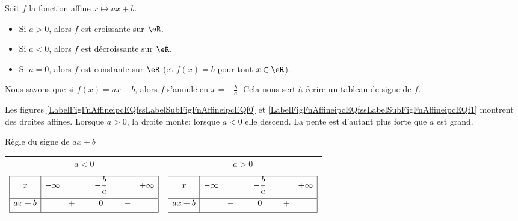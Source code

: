 \begin{Aretenir}
      Soit $f$ la fonction affine $x\mapsto ax+b$.
      \begin{itemize}
      \item Si $a>0$, alors $f$ est croissante sur $\eR$.
      \item Si $a<0$, alors $f$ est décroissante sur $\eR$.
      \item Si $a=0$, alors $f$ est constante sur $\eR$
        (et $f(x)=b$ pour tout $x\in\eR$).
      \end{itemize}
\end{Aretenir}
Nous savons que si \( f(x)=ax+b\), alors \( f\) s'annule en \( x=-\frac{ b }{ a }\). Cela nous sert à écrire un tableau de signe de \( f\).



Les figures \ref{LabelFigFnAffineipcEQfssLabelSubFigFnAffineipcEQf0} et \ref{LabelFigFnAffineipcEQfssLabelSubFigFnAffineipcEQf1} montrent des droites affines. Lorsque \( a>0\), la droite monte; lorsque \( a<0\) elle descend. La pente est d'autant plus forte que \( a\) est grand.
\newcommand{\CaptionFigFnAffineipcEQf}{Deux droites affines.}





\begin{Aretenir}
      Règle du signe de $ax+b$ \\
      
      \begin{tabular}{cc}
        $a<0$ & $a>0$ \\
        & \\
        $\begin{array}{|c|ccccc|}
          \hline
          x & -\infty & & -\dfrac{b}{a} & & +\infty \\[2ex]
          \hline
          ax+b & & + \quad \ & 0 & \quad - & \\[1ex]
          \hline
        \end{array}$
        &
        $\begin{array}{|c|ccccc|}
          \hline
          x & -\infty & & -\dfrac{b}{a} & & +\infty \\[2ex]
          \hline
          ax+b & & - \quad \ & 0 & \quad + & \\[1ex]
          \hline
        \end{array}$ \\
      \end{tabular}  \\[1ex] 
\end{Aretenir}



